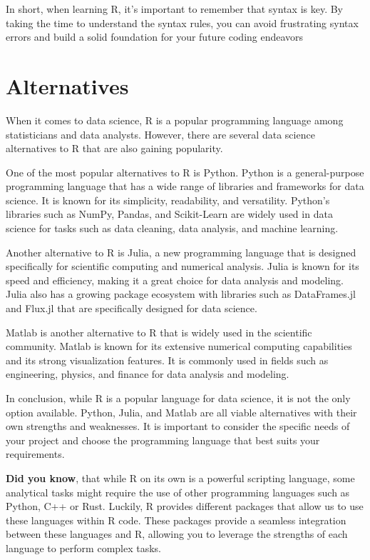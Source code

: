 \documentclass[
]{book}
\begin{document}
In short, when learning R, it's important to remember that syntax is key. By taking the time to understand the syntax rules, you can avoid frustrating syntax errors and build a solid foundation for your future coding endeavors

\hypertarget{alternatives}{%
\section*{Alternatives}\label{alternatives}}

When it comes to data science, R is a popular programming language among statisticians and data analysts. However, there are several data science alternatives to R that are also gaining popularity.

One of the most popular alternatives to R is Python. Python is a general-purpose programming language that has a wide range of libraries and frameworks for data science. It is known for its simplicity, readability, and versatility. Python's libraries such as NumPy, Pandas, and Scikit-Learn are widely used in data science for tasks such as data cleaning, data analysis, and machine learning.

Another alternative to R is Julia, a new programming language that is designed specifically for scientific computing and numerical analysis. Julia is known for its speed and efficiency, making it a great choice for data analysis and modeling. Julia also has a growing package ecosystem with libraries such as DataFrames.jl and Flux.jl that are specifically designed for data science.

Matlab is another alternative to R that is widely used in the scientific community. Matlab is known for its extensive numerical computing capabilities and its strong visualization features. It is commonly used in fields such as engineering, physics, and finance for data analysis and modeling.

In conclusion, while R is a popular language for data science, it is not the only option available. Python, Julia, and Matlab are all viable alternatives with their own strengths and weaknesses. It is important to consider the specific needs of your project and choose the programming language that best suits your requirements.

\textbf{Did you know}, that while R on its own is a powerful scripting language, some analytical tasks might require the use of other programming languages such as Python, C++ or Rust. Luckily, R provides different packages that allow us to use these languages within R code. These packages provide a seamless integration between these languages and R, allowing you to leverage the strengths of each language to perform complex tasks.
\end{document}
